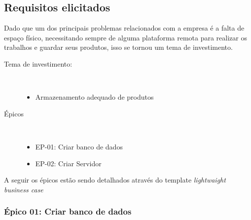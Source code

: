 \subsection{Requisitos elicitados}

  Dado que um dos principais problemas relacionados com a empresa é a falta de espaço físico, necessitando sempre de alguma plataforma remota
  para realizar os trabalhos e guardar seus produtos, isso se tornou um tema de investimento.

  \begin{description}
    \item[Tema de investimento:] \
      \begin{itemize}
        \item Armazenamento adequado de produtos
      \end{itemize}
    \item[Épicos] \
      \begin{itemize}
        \item EP-01: Criar banco de dados
        \item EP-02: Criar Servidor
      \end{itemize}
  \end{description}

  A seguir os épicos estão sendo detalhados através do template \textit{lightwaight business case}

\subsubsection{Épico 01: Criar banco de dados}

